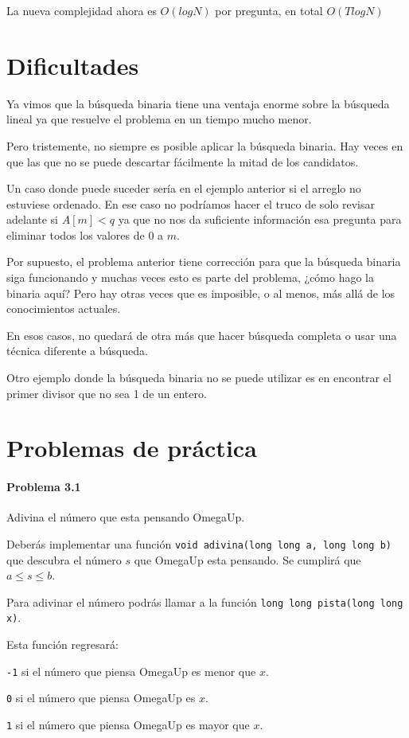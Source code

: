 La nueva complejidad ahora es \(O(logN)\) por pregunta, en total \(O(TlogN)\)

\section*{Dificultades}
Ya vimos que la búsqueda binaria tiene una ventaja enorme sobre la búsqueda lineal ya que resuelve el problema en un tiempo mucho menor.

Pero tristemente, no siempre es posible aplicar la búsqueda binaria. Hay veces en que las que no se puede descartar fácilmente la mitad de los candidatos.

Un caso donde puede suceder sería en el ejemplo anterior si el arreglo no estuviese ordenado. En ese caso no podríamos hacer el truco de solo revisar adelante si \(A[m]<q\) ya que no nos da suficiente información esa pregunta para eliminar todos los valores de \(0\) a \(m\).

Por supuesto, el problema anterior tiene corrección para que la búsqueda binaria siga funcionando y muchas veces esto es parte del problema, ¿cómo hago la binaria aquí? Pero hay otras veces que es imposible, o al menos, más allá de los conocimientos actuales.

En esos casos, no quedará de otra más que hacer búsqueda completa o usar una técnica diferente a búsqueda.

Otro ejemplo donde la búsqueda binaria no se puede utilizar es en encontrar el primer divisor que no sea 1 de un entero.
\newpage
\section*{Problemas de práctica}

\paragraph{Problema 3.1} Adivina el número que esta pensando OmegaUp.

Deberás implementar una función \verb|void adivina(long long a, long long b)| que descubra el número \(s\) que OmegaUp esta pensando. Se cumplirá que \(a\leq s\leq b\).

Para adivinar el número podrás llamar a la función \verb|long long pista(long long x)|.

Esta función regresará:
\begin{plimits}
	\item \verb|-1| si el número que piensa OmegaUp es menor que \(x\).
	\item \verb|0| si el número que piensa OmegaUp es \(x\).
	\item \verb|1| si el número que piensa OmegaUp es mayor que \(x\).
\end{plimits} 

